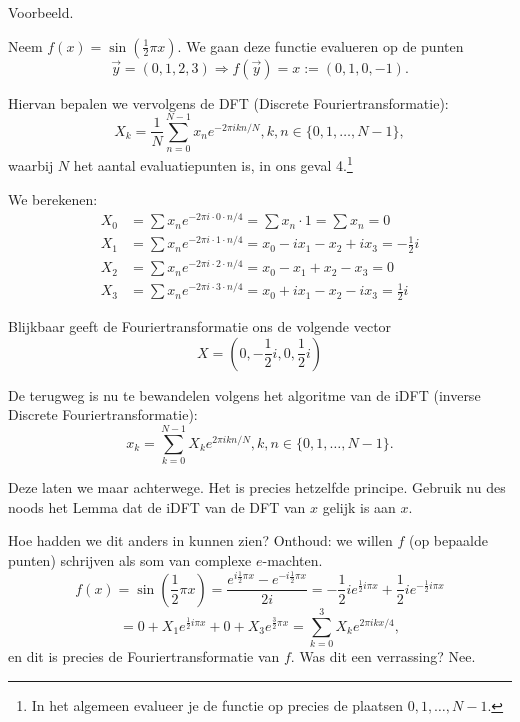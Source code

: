 \documentclass[11pt]{amsart}
\theoremstyle{definition}
\begin{document}
\title{}
\author{Jan Westerdiep}
\maketitle

Voorbeeld.

Neem $f(x) = \sin( \frac{1}{2} \pi x )$. We gaan deze functie evalueren op de punten
\[
\vec{y} = (0, 1, 2, 3) \Rightarrow f(\vec{y}) = x := (0, 1, 0, -1).
\]

Hiervan bepalen we vervolgens de DFT (Discrete Fouriertransformatie):
\[
  X_k = \frac{1}{N}\sum_{n=0}^{N-1} x_n e^{- 2 \pi i k n / N}, k,n \in \{0,1,\ldots,N-1\},
\]
waarbij $N$ het aantal evaluatiepunten is, in ons geval 4.\footnote{In het algemeen evalueer je de functie op precies de plaatsen $0,1,\ldots,N-1$.}

We berekenen:
\begin{align*}
  X_0 &= \sum x_n e^{-2 \pi i\cdot 0 \cdot n/4} = \sum x_n \cdot 1 = \sum x_n = 0 \\
  X_1 &= \sum x_n e^{-2 \pi i\cdot 1 \cdot n/4} = x_0 - i x_1 - x_2 + i x_3 = -\frac{1}{2}i \\
  X_2 &= \sum x_n e^{-2 \pi i\cdot 2 \cdot n/4} = x_0 - x_1 + x_2 - x_3 = 0 \\
  X_3 &= \sum x_n e^{-2 \pi i\cdot 3 \cdot n/4} = x_0 + i x_1 - x_2 - i x_3 = \frac{1}{2} i
\end{align*}

Blijkbaar geeft de Fouriertransformatie ons de volgende vector
\[
  X = (0, -\frac{1}{2}i, 0, \frac{1}{2}i)
\]

De terugweg is nu te bewandelen volgens het algoritme van de iDFT (inverse Discrete Fouriertransformatie):
\[
  x_k = \sum_{k=0}^{N-1} X_k e^{2 \pi i k n / N}, k,n \in \{ 0, 1, \ldots, N-1 \}.
\]

Deze laten we maar achterwege. Het is precies hetzelfde principe. Gebruik nu des noods het Lemma dat de iDFT van de DFT van $x$ gelijk is aan $x$.

Hoe hadden we dit anders in kunnen zien? Onthoud: we willen $f$ (op bepaalde punten) schrijven als som van complexe $e$-machten.
\[
f(x) = \sin( \frac{1}{2} \pi x) = \frac{ e^{i \frac{1}{2} \pi x} - e^{- i \frac{1}{2} \pi x} }{2 i} = -\frac{1}{2}i e^{\frac{1}{2} i \pi x} + \frac{1}{2} i e^{-\frac{1}{2} i \pi x}
\]
\[
= 0 + X_1 e^{\frac{1}{2} i \pi x} + 0 + X_3 e^{\frac{3}{2} \pi x} = \sum_{k=0}^{3} X_k e^{2 \pi i k x/4},
\]
en dit is precies de Fouriertransformatie van $f$. Was dit een verrassing? Nee.
\end{document}
